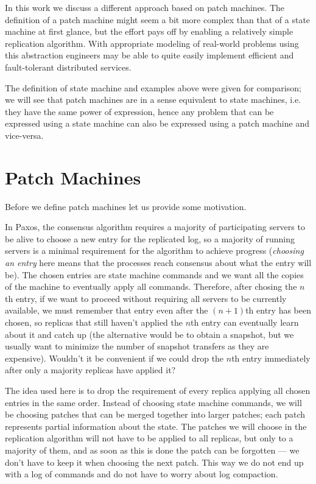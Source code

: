 \documentclass[12pt,a4paper,en]{pracamgr}
\newcommand{\ti}[1]{\textit{#1}}
\begin{document}
In this work we discuss a different approach based on patch machines. The definition of a patch machine might seem a bit more complex than that of a state machine at first glance, but the effort pays off by enabling a relatively simple replication algorithm. With appropriate modeling of real-world problems using this abstraction engineers may be able to quite easily implement efficient and fault-tolerant distributed services.

The definition of state machine and examples above were given for comparison; we will see that patch machines are in a sense equivalent to state machines, i.e. they have the same power of expression, hence any problem that can be expressed using a state machine can also be expressed using a patch machine and vice-versa.

\section{Patch Machines}\label{sect-pms}

Before we define patch machines let us provide some motivation.

In Paxos, the consensus algorithm requires a majority of participating servers to be alive to choose a new entry for the replicated log, so a majority of running servers is a minimal requirement for the algorithm to achieve progress (\ti{choosing an entry} here means that the processes reach consensus about what the entry will be). The chosen entries are state machine commands and we want all the copies of the machine to eventually apply all commands. Therefore, after chosing the $n$th entry, if we want to proceed without requiring all servers to be currently available, we must remember that entry even after the $(n+1)$th entry has been chosen, so replicas that still haven't applied the $n$th entry can eventually learn about it and catch up (the alternative would be to obtain a snapshot, but we usually want to minimize the number of snapshot transfers as they are expensive). Wouldn't it be convenient if we could drop the $n$th entry immediately after only a majority replicas have applied it?

The idea used here is to drop the requirement of every replica applying all chosen entries in the same order. Instead of choosing state machine commands, we will be choosing patches that can be merged together into larger patches; each patch represents partial information about the state. The patches we will choose in the replication algorithm will not have to be applied to all replicas, but only to a majority of them, and as soon as this is done the patch can be forgotten --- we don't have to keep it when choosing the next patch. This way we do not end up with a log of commands and do not have to worry about log compaction.
\end{document}
